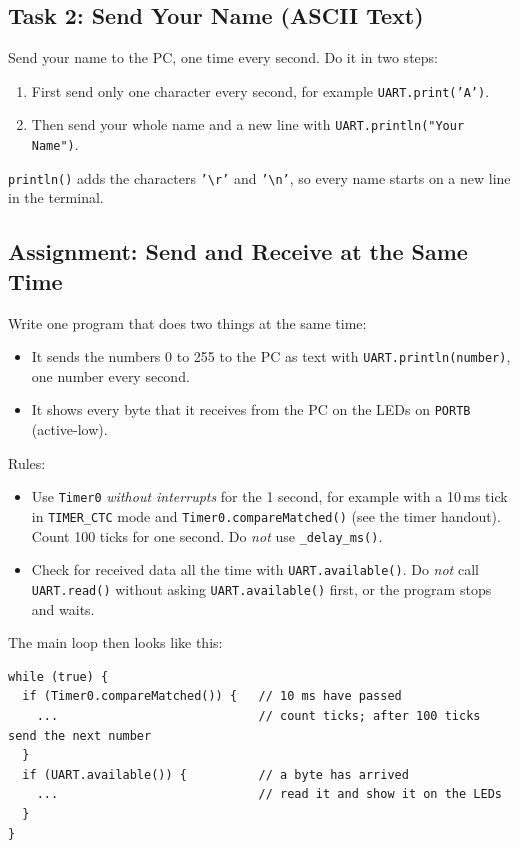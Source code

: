 \documentclass[11pt,a4paper]{article}
\newcommand{\code}[1]{\texttt{#1}}
\begin{document}
\subsection*{Task 2: Send Your Name (ASCII Text)}
Send your name to the PC, one time every second. Do it in two steps:
\begin{enumerate}
  \item First send only one character every second, for example
        \code{UART.print('A')}.
  \item Then send your whole name and a new line with
        \code{UART.println("Your Name")}.
\end{enumerate}
\code{println()} adds the characters \code{'\textbackslash r'} and
\code{'\textbackslash n'}, so every name starts on a new line in the terminal.

\subsection*{Assignment: Send and Receive at the Same Time}
Write one program that does two things at the same time:
\begin{itemize}
  \item It sends the numbers 0 to 255 to the PC as text with
        \code{UART.println(number)}, one number every second.
  \item It shows every byte that it receives from the PC on the LEDs on
        \code{PORTB} (active-low).
\end{itemize}
Rules:
\begin{itemize}
  \item Use \code{Timer0} \emph{without interrupts} for the 1 second, for example
        with a 10\,ms tick in \code{TIMER\_CTC} mode and
        \code{Timer0.compareMatched()} (see the timer handout). Count 100 ticks
        for one second. Do \emph{not} use \code{\_delay\_ms()}.
  \item Check for received data all the time with \code{UART.available()}.
        Do \emph{not} call \code{UART.read()} without asking
        \code{UART.available()} first, or the program stops and waits.
\end{itemize}

The main loop then looks like this:
\begin{lstlisting}
while (true) {
  if (Timer0.compareMatched()) {   // 10 ms have passed
    ...                            // count ticks; after 100 ticks send the next number
  }
  if (UART.available()) {          // a byte has arrived
    ...                            // read it and show it on the LEDs
  }
}
\end{lstlisting}
\end{document}
